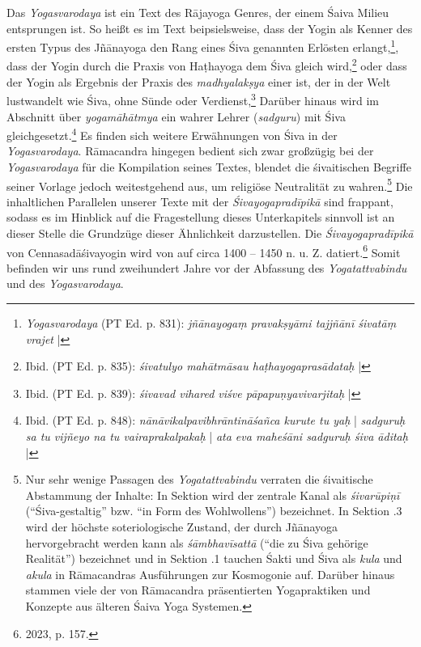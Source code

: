 Das \textit{Yogasvarodaya} ist ein Text des Rājayoga Genres, der einem Śaiva Milieu entsprungen ist. So heißt es im Text beipsielsweise, dass der Yogin als Kenner des ersten Typus des Jñānayoga den Rang eines Śiva genannten Erlösten erlangt,\footnote{ \textit{Yogasvarodaya} (PT Ed. p. 831): \textit{jñānayogaṃ pravakṣyāmi tajjñānī śivatāṃ vrajet} |}, dass der Yogin durch die Praxis von Haṭhayoga dem Śiva gleich wird,\footnote{Ibid. (PT Ed. p. 835): \textit{śivatulyo mahātmāsau haṭhayogaprasādataḥ} |} oder dass der Yogin als Ergebnis der Praxis des \textit{madhyalakṣya} einer ist, der in der Welt lustwandelt wie Śiva, ohne Sünde oder Verdienst,\footnote{Ibid. (PT Ed. p. 839): \textit{śivavad vihared viśve pāpapuṇyavivarjitaḥ} |} Darüber hinaus wird im Abschnitt über \textit{yogamāhātmya} ein wahrer Lehrer (\textit{sadguru}) mit Śiva gleichgesetzt.\footnote{Ibid. (PT Ed. p. 848): \textit{nānāvikalpavibhrāntināśañca kurute tu yaḥ} | \textit{sadguruḥ sa tu vijñeyo na tu vairaprakalpakaḥ} | \textit{ata eva maheśāni sadguruḥ śiva āditaḥ} |} Es finden sich weitere Erwähnungen von Śiva in der \textit{Yogasvarodaya}. Rāmacandra hingegen bedient sich zwar großzügig bei der \textit{Yogasvarodaya} für die Kompilation seines Textes, blendet die śivaitischen Begriffe seiner Vorlage jedoch weitestgehend aus, um religiöse Neutralität zu wahren.\footnote{Nur sehr wenige Passagen des \textit{Yogatattvabindu} verraten die śivaitische Abstammung der Inhalte: In Sektion  wird der zentrale Kanal als \textit{śivarūpiṇī} (``Śiva-gestaltig'' bzw. ``in Form des Wohlwollens'') bezeichnet. In Sektion .3 wird der höchste soteriologische Zustand, der durch Jñānayoga hervorgebracht werden kann als \textit{śāmbhavīsattā} (``die zu Śiva gehörige Realität'') bezeichnet und in Sektion .1 tauchen Śakti und Śiva als \textit{kula} und \textit{akula} in Rāmacandras Ausführungen zur Kosmogonie auf. Darüber hinaus stammen viele der von Rāmacandra präsentierten Yogapraktiken und Konzepte aus älteren Śaiva Yoga Systemen.}   
Die inhaltlichen Parallelen unserer Texte mit der \textit{Śivayogapradīpikā} sind frappant, sodass es im Hinblick auf die Fragestellung dieses Unterkapitels sinnvoll ist an dieser Stelle die Grundzüge dieser Ähnlichkeit darzustellen. Die \textit{Śivayogapradīpikā} von Cennasadāśivayogin wird von \citeauthor{powell2023} auf circa 1400 – 1450 n. u. Z. datiert.\footnote{\citeauthor{powell2023} 2023, p. 157.} Somit befinden wir uns rund zweihundert Jahre vor der Abfassung des \textit{Yogatattvabindu} und des \textit{Yogasvarodaya}. 
